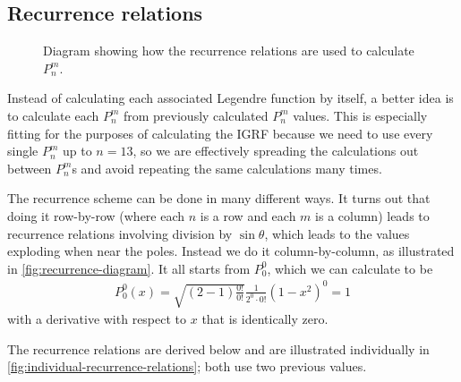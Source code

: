 \documentclass[12pt]{article}
\begin{document}
\subsection{Recurrence relations}
\begin{figure}[htbp]
  \centering
  \caption{Diagram showing how the recurrence relations are used to calculate $P_n^m$.}
  \label{fig:recurrence-diagram}
\end{figure}

Instead of calculating each associated Legendre function by itself, a better idea is to calculate each $P_n^m$ from previously calculated $P_n^m$ values. This is especially fitting for the purposes of calculating the IGRF because we need to use every single $P_n^m$ up to $n=13$, so we are effectively spreading the calculations out between $P_n^m$s and avoid repeating the same calculations many times. 

The recurrence scheme can be done in many different ways. It turns out that doing it row-by-row (where each $n$ is a row and each $m$ is a column) leads to recurrence relations involving division by $\sin\theta$, which leads to the values exploding when near the poles. Instead we do it column-by-column, as illustrated in \autoref{fig:recurrence-diagram}. It all starts from $P_0^0$, which we can calculate to be 
\begin{align}
  P_0^0(x) = \sqrt{(2 - 1)\frac{0!}{0!}}\frac{1}{2^0\cdot 0!}(1 - x^2)^0 = 1
\end{align}
with a derivative with respect to $x$ that is identically zero.

The recurrence relations are derived below and are illustrated individually in \autoref{fig:individual-recurrence-relations}; both use two previous values.
\end{document}
